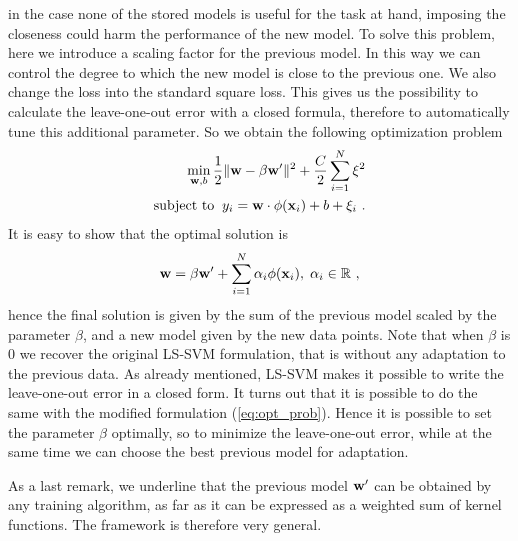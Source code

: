 in the case none of the stored models is useful for the task at hand,
imposing the closeness could harm the performance of the new model.
To solve this problem, here we introduce a scaling factor for
the previous model. In this way we can control the degree to which
the new model is close to the previous one.
We also change the loss into the standard square loss. This
gives us the possibility to calculate the leave-one-out error with a
closed formula, therefore
to automatically tune this additional parameter. So we obtain the
following optimization problem
\begin{align} 
  \min_{\mathbf{w},b} \frac{1}{2} \|\mathbf{w}- \beta \mathbf{w}'\|^2 + \frac{C}{2} \sum_{i=1}^N \xi^2 \nonumber \\
  \mbox{subject to} \;\; y_i = \mathbf{w} \cdot \phi(\mathbf{x}_i) + b + \xi_i~.
  \label{eq:opt_prob}
\end{align}
It is easy to show that the optimal solution is %
\begin{equation}
  \mathbf{w} = \beta \mathbf{w}' + \sum_{i=1}^N \alpha_i \phi(\mathbf{x}_i), \; \alpha_i \in \mathbb{R}~,
\end{equation}
\noindent hence the final solution is given by the sum of the previous model
scaled by the parameter $\beta$, and a new model given by the new data
points.  Note that when $\beta$ is $0$ we recover the original LS-SVM
formulation, that is without any adaptation to the previous data.  As
already mentioned, LS-SVM makes it possible to write the leave-one-out
error in a closed form. It turns out that it is possible to do the
same with the modified formulation (\ref{eq:opt_prob}). Hence it is
possible to set the parameter $\beta$ optimally, so to minimize the
leave-one-out error,
while at the same time we can choose the best previous model for
adaptation.

As a last remark, we underline that the previous model $\mathbf{w}'$ can be
obtained by any training algorithm, as far as it can be expressed as a
weighted sum of kernel functions.  The framework is therefore very
general.
